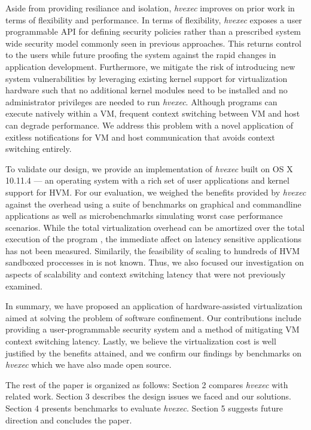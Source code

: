 \documentclass{article}
\newcommand{\PROJNAME}{\textit{hvexec}}
\begin{document}
Aside from providing resiliance and isolation, \PROJNAME{} improves on prior work in terms of flexibility and performance.
In terms of flexibility, \PROJNAME{} exposes a user programmable API for defining security policies rather than a prescribed system wide security model commonly seen in previous approaches.
This returns control to the users while future proofing the system against the rapid changes in application development.
Furthermore, we mitigate the risk of introducing new system vulnerabilities by leveraging existing kernel support for virtualization hardware
such that no additional kernel modules need to be installed and no administrator privileges are needed to run \PROJNAME{}.
Although programs can execute natively within a VM, frequent context switching between VM and host can degrade performance.
We address this problem with a novel application of exitless notifications \cite{ELI2015} for VM and host communication that avoids
context switching entirely.

To validate our design, we provide an implementation of \PROJNAME{} built on OS X 10.11.4 — an operating system with
a rich set of user applications and kernel support for HVM.
For our evaluation, we weighed the benefits provided by \PROJNAME{} against the overhead using a suite of benchmarks on graphical and commandline applications as well as
microbenchmarks simulating worst case performance scenarios.
While the total virtualization overhead can be amortized over the total execution of the program \cite{Ayer2012, VCall2010}, the immediate affect on latency
sensitive applications has not been measured.
Similarily, the feasibility of scaling to hundreds of HVM sandboxed proccesses in is not known.
Thus, we also focused our investigation on aspects of scalability and context switching latency that were not previously examined.

In summary, we have proposed an application of hardware-assisted virtualization aimed at solving the problem of software confinement.
Our contributions include providing a user-programmable security system and a method of mitigating VM context switching latency.
Lastly, we believe the virtualization cost is well justified by the benefits attained, and we confirm our findings by benchmarks on \PROJNAME{} which we have also made open source.

The rest of the paper is organized as follows:
Section 2 compares \PROJNAME{} with related work.
Section 3 describes the design issues we faced and our solutions.
Section 4 presents benchmarks to evaluate \PROJNAME{}.
Section 5 suggests future direction and concludes the paper.
\end{document}
